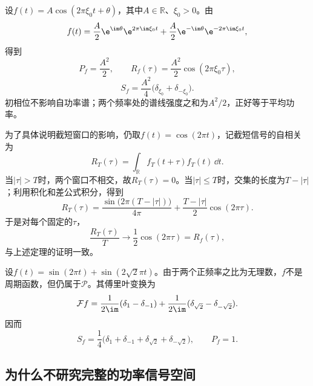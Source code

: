 \begin{example}[单个余弦函数]
    设$f(t)=A\cos(2\pi\xi_0t+\theta)$，其中$A\in\mathbb{R}$、$\xi_0>0$。由
    \begin{equation}
        f(t)=\frac{A}{2}\e^{\im\theta}\e^{2\pi\im\xi_0t}+\frac{A}{2}\e^{-\im\theta}\e^{-2\pi\im\xi_0t},
    \end{equation}
    得到
    \begin{equation}
        P_f=\frac{A^2}{2},\qquad R_f(\tau)=\frac{A^2}{2}\cos(2\pi\xi_0\tau),
    \end{equation}
    \begin{equation}
        S_f=\frac{A^2}{4}\bigl(\delta_{\xi_0}+\delta_{-\xi_0}\bigr).
    \end{equation}
    初相位不影响自功率谱；两个频率处的谱线强度之和为$A^2/2$，正好等于平均功率。
\end{example}

为了具体说明截短窗口的影响，仍取$f(t)=\cos(2\pi t)$，记截短信号的自相关为
\begin{equation}
    R_T(\tau)=\int_{\mathbb{R}}f_T(t+\tau)f_T(t)\,\dd t.
\end{equation}
当$|\tau|>T$时，两个窗口不相交，故$R_T(\tau)=0$。当$|\tau|\le T$时，交集的长度为$T-|\tau|$；利用积化和差公式积分，得到
\begin{equation}
    R_T(\tau)=\frac{\sin\bigl(2\pi(T-|\tau|)\bigr)}{4\pi}+\frac{T-|\tau|}{2}\cos(2\pi\tau).
\end{equation}
于是对每个固定的$\tau$，
\begin{equation}
    \frac{R_T(\tau)}{T}\longrightarrow\frac{1}{2}\cos(2\pi\tau)=R_f(\tau),
\end{equation}
与上述定理的证明一致。

\begin{example}
    设$f(t)=\sin(2\pi t)+\sin(2\sqrt{2}\pi t)$。由于两个正频率之比为无理数，$f$不是周期函数，但仍属于$\mathcal{P}$。其傅里叶变换为
    \begin{equation}
        \mathcal{F}f=\frac{1}{2\im}(\delta_1-\delta_{-1})+\frac{1}{2\im}(\delta_{\sqrt{2}}-\delta_{-\sqrt{2}}).
    \end{equation}
    因而
    \begin{equation}
        S_f=\frac{1}{4}\bigl(\delta_1+\delta_{-1}+\delta_{\sqrt{2}}+\delta_{-\sqrt{2}}\bigr),\qquad P_f=1.
    \end{equation}
\end{example}

\subsection{为什么不研究完整的功率信号空间}\label{sub:power_signal_scope}

